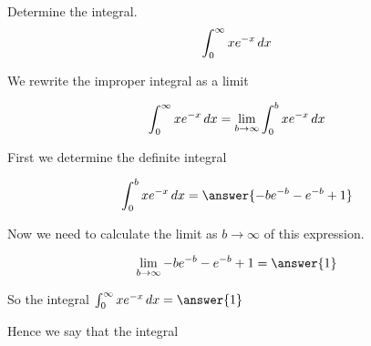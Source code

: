 \documentclass{ximera}
\author{Jason Miller}
\begin{document}
\begin{exercise}
Determine the integral.
\[
\int_{0}^{\infty} xe^{-x} \mathop{}\!d x
\]


We rewrite the improper integral as a limit 

\[
\int_{0}^{\infty} xe^{-x} \mathop{}\!d x= \lim_{b \to \infty} \int_{0}^{b} xe^{-x} \mathop{}\!d x
\]


First we determine the definite integral

\[
\int_{0}^{b} xe^{-x} \d x=\answer{ -be^{-b}-e^{-b} +1 } 
\]




\begin{exercise}
Now we need to calculate the limit as $b \to \infty$ of this expression. 

\[
\lim_{b \to \infty}  -be^{-b}-e^{-b} +1 =\answer{ 1}
\]

\begin{exercise}
So the  integral $\int_{0}^{\infty} xe^{-x} \d x=\answer{1}$

\begin{exercise}
 Hence we say that the integral 

\begin{multipleChoice}
\end{multipleChoice}



\end{exercise}
\end{exercise}
\end{exercise}
\end{exercise}
\end{document}
